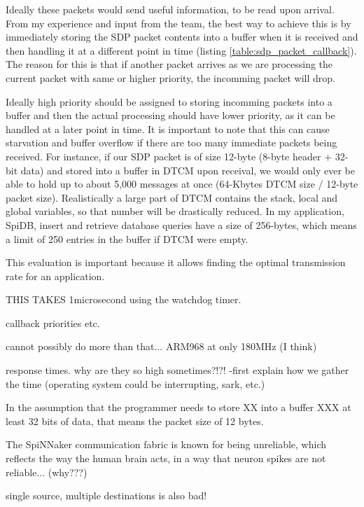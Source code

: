 Ideally these packets would send useful information, to be read upon arrival. From my experience and input from the team, the best way to achieve this is by immediately storing the SDP packet contents into a buffer when it is received and then handling it at a different point in time (listing \ref{table:sdp_packet_callback}). The reason for this is that if another packet arrives as we are processing the current packet with same or higher priority, the incomming packet will drop.

Ideally high priority should be assigned to storing incomming packets into a buffer and then the actual processing should have lower priority, as it can be handled at a later point in time. It is important to note that this can cause starvation and buffer overflow if there are too many immediate packets being received. For instance, if our SDP packet is of size 12-byte (8-byte header + 32-bit data) and stored into a buffer in DTCM upon receival, we would only ever be able to hold up to about 5,000 messages at once (64-Kbytes DTCM size / 12-byte packet size). Realistically a large part of DTCM contains the stack, local and global variables, so that number will be drastically reduced. In my application, SpiDB, insert and retrieve database queries have a size of 256-bytes, which means a limit of 250 entries in the buffer if DTCM were empty.

This evaluation is important because it allows finding the optimal transmission rate for an application.




THIS TAKES 1microsecond using the watchdog timer.

callback priorities etc.

cannot possibly do more than that...
ARM968 at only 180MHz (I think)

response times. why are they so high sometimes?!?!
-first explain how we gather the time (operating system could be interrupting, sark, etc.)


In the assumption that the programmer needs to store XX into a buffer XXX
at least 32 bits of data, that means the packet size of 12 bytes.


The SpiNNaker communication fabric is known for being unreliable, which reflects the way the human brain acts, in a way that neuron spikes are not reliable... (why???)

single source, multiple destinations is also bad!

